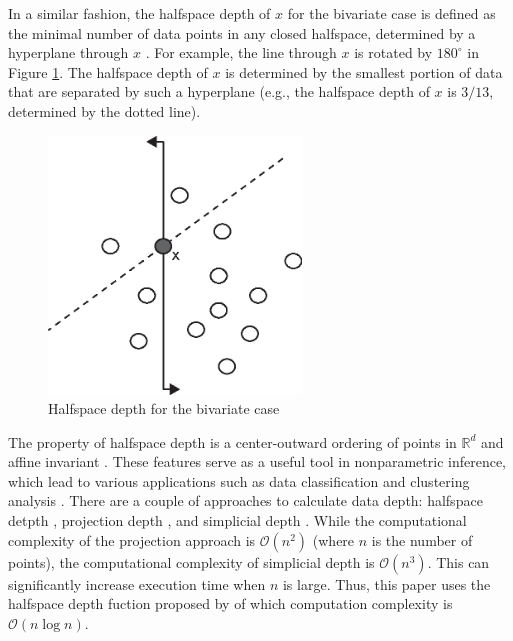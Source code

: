 \documentclass[a4paper,UKenglish]{lipics-v2016}
\providecommand{\DIFadd}[1]{{\protect\color{blue}\uwave{#1}}} %
\providecommand{\DIFaddbegin}{} %
\providecommand{\DIFaddend}{} %
\begin{document}
In a similar fashion, the halfspace depth of $x$ for the bivariate case is defined as the minimal number of data points in any closed halfspace, \DIFaddbegin \DIFadd{which is }\DIFaddend determined by a hyperplane through $x$ \cite{rousseeuw96RSS}. For example, the line through $x$ is rotated by $180^{\circ}$ in Figure \ref{fig:hd_bi}. The halfspace depth of $x$ is determined by the smallest portion of data that are separated by such a hyperplane (e.g.,  the halfspace depth of $x$ is $3/13$, determined by the dotted line).

\begin{figure}
	\centering
	\includegraphics[width=0.6\textwidth]{images/depth_bi.eps}
	\caption{Halfspace depth for the bivariate case}
	\label{fig:hd_bi}	
\end{figure}

The property of halfspace depth is a center-outward ordering of points in  $\mathbb{R}^d$ and affine invariant \cite{Mosler13book}. These features serve as a useful tool in nonparametric inference, which lead to various applications such as data classification and clustering analysis
\cite{lange14fSP,jeong16acmgis}. There are a couple of approaches to calculate data depth: halfspace detpth \cite{rousseeuw96RSS}, projection depth \cite{wilcox03CSSC}, and simplicial depth \cite{liu90AS}. While the computational complexity of the projection approach is $\mathcal{O}(n^2)$ (where $n$ is the number of points), the computational complexity of simplicial depth is $\mathcal{O}(n^3)$. This can significantly increase execution time when $n$ is large. Thus, this paper uses the halfspace depth fuction proposed by \cite{rousseeuw96RSS} of which computation complexity is $\mathcal{O}(n\log{}n)$.
\end{document}
